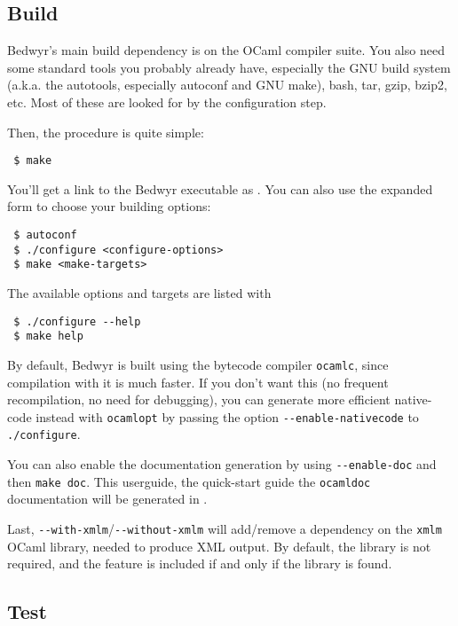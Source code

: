 \subsection{Build}

Bedwyr's main build dependency is on the OCaml compiler suite.  You also
need some standard tools you probably already have, especially the GNU
build system (a.k.a. the autotools, especially autoconf and GNU make),
bash, tar, gzip, bzip2, etc.  Most of these are looked for by the
configuration step.

Then, the procedure is quite simple:

\begin{verbatim}
 $ make
\end{verbatim}

You'll get a link to the Bedwyr executable as .  You can
also use the expanded form to choose your building options:

\begin{verbatim}
 $ autoconf
 $ ./configure <configure-options>
 $ make <make-targets>
\end{verbatim}

The available options and targets are listed with

\begin{verbatim}
 $ ./configure --help
 $ make help
\end{verbatim}

By default, Bedwyr is built using the bytecode compiler \verb.ocamlc.,
since compilation with it is much faster.  If you don't want this (no
frequent recompilation, no need for debugging), you can generate more
efficient native-code instead with \verb.ocamlopt. by passing the option
\verb.--enable-nativecode. to \verb|./configure|.

You can also enable the documentation generation by using
\verb|--enable-doc| and then \verb|make doc|.  This userguide, the
quick-start guide the \verb|ocamldoc| documentation will be generated
in .

Last, \verb|--with-xmlm|/\verb|--without-xmlm| will add/remove a
dependency on the \verb|xmlm| OCaml library, needed to produce XML
output.  By default, the library is not required, and the feature is
included if and only if the library is found.

\subsection{Test}


